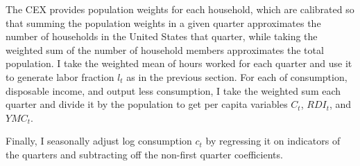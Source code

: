 The CEX provides population weights for each household, which are calibrated so that summing the population weights in a given quarter approximates the number of households in the United States that quarter, while taking the weighted sum of the number of household members approximates the total population. I take the weighted mean of hours worked for each quarter and use it to generate labor fraction $l_t$ as in the previous section. For each of consumption, disposable income, and output less consumption, I take the weighted sum each quarter and divide it by the population to get per capita variables $C_t$, $RDI_t$, and $YMC_t$.

Finally, I seasonally adjust log consumption $c_t$ by regressing it on indicators of the quarters and subtracting off the non-first quarter coefficients.